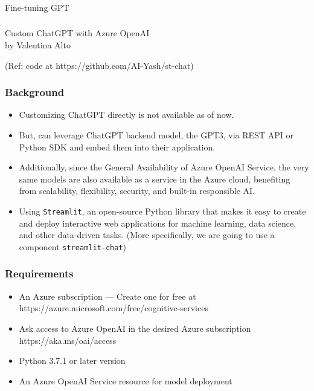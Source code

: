 \begin{frame}[fragile]\frametitle{}
\begin{center}
{\Large Fine-tuning GPT}
\end{center}
\end{frame}

\begin{frame}[fragile]\frametitle{}
\begin{center}
{\Large Custom ChatGPT with Azure OpenAI \\ by Valentina Alto}

{\tiny (Ref: code at https://github.com/AI-Yash/st-chat)}

\end{center}
\end{frame}

\begin{frame}[fragile]\frametitle{ Background}


\begin{itemize}
\item Customizing ChatGPT directly is not available as of now.
\item But, can leverage ChatGPT backend model, the GPT3, via REST API or Python SDK and embed them into their application.
\item Additionally, since the General Availability of Azure OpenAI Service, the very same models are also available as a service in the Azure cloud, benefiting from scalability, flexibility, security, and built-in responsible AI.
\item Using  \lstinline|Streamlit|, an open-source Python library that makes it easy to create and deploy interactive web applications for machine learning, data science, and other data-driven tasks. (More specifically, we are going to use a component \lstinline|streamlit-chat|)
\end{itemize}	 

\end{frame}

\begin{frame}[fragile]\frametitle{ Requirements}

\begin{itemize}
\item An Azure subscription — Create one for free at https://azure.microsoft.com/free/cognitive-services
\item Ask access to Azure OpenAI in the desired Azure subscription https://aka.ms/oai/access
\item Python 3.7.1 or later version
\item An Azure OpenAI Service resource for model deployment
\end{itemize}	 

\end{frame}

